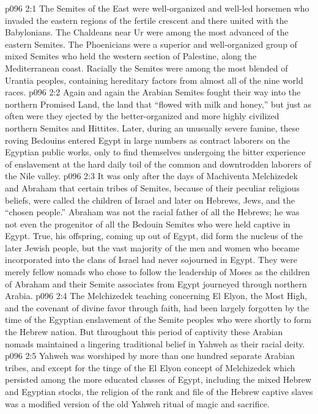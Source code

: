 \vs p096 2:1 The Semites of the East were well\hyp{}organized and well\hyp{}led horsemen who invaded the eastern regions of the fertile crescent and there united with the Babylonians. The Chaldeans near Ur were among the most advanced of the eastern Semites. The Phoenicians were a superior and well\hyp{}organized group of mixed Semites who held the western section of Palestine, along the Mediterranean coast. Racially the Semites were among the most blended of Urantia peoples, containing hereditary factors from almost all of the nine world races.
\vs p096 2:2 Again and again the Arabian Semites fought their way into the northern Promised Land, the land that “flowed with milk and honey,” but just as often were they ejected by the better\hyp{}organized and more highly civilized northern Semites and Hittites. Later, during an unusually severe famine, these roving Bedouins entered Egypt in large numbers as contract laborers on the Egyptian public works, only to find themselves undergoing the bitter experience of enslavement at the hard daily toil of the common and downtrodden laborers of the Nile valley.
\vs p096 2:3 It was only after the days of Machiventa Melchizedek and Abraham that certain tribes of Semites, because of their peculiar religious beliefs, were called the children of Israel and later on Hebrews, Jews, and the “chosen people.” Abraham was not the racial father of all the Hebrews; he was not even the progenitor of all the Bedouin Semites who were held captive in Egypt. True, his offspring, coming up out of Egypt, did form the nucleus of the later Jewish people, but the vast majority of the men and women who became incorporated into the clans of Israel had never sojourned in Egypt. They were merely fellow nomads who chose to follow the leadership of Moses as the children of Abraham and their Semite associates from Egypt journeyed through northern Arabia.\plusone
\pc \vs p096 2:4 The Melchizedek teaching concerning El Elyon, the Most High, and the covenant of divine favor through faith, had been largely forgotten by the time of the Egyptian enslavement of the Semite peoples who were shortly to form the Hebrew nation. But throughout this period of captivity these Arabian nomads maintained a lingering traditional belief in Yahweh as their racial deity.
\vs p096 2:5 Yahweh was worshiped by more than one hundred separate Arabian tribes, and except for the tinge of the El Elyon concept of Melchizedek which persisted among the more educated classes of Egypt, including the mixed Hebrew and Egyptian stocks, the religion of the rank and file of the Hebrew captive slaves was a modified version of the old Yahweh ritual of magic and sacrifice.
